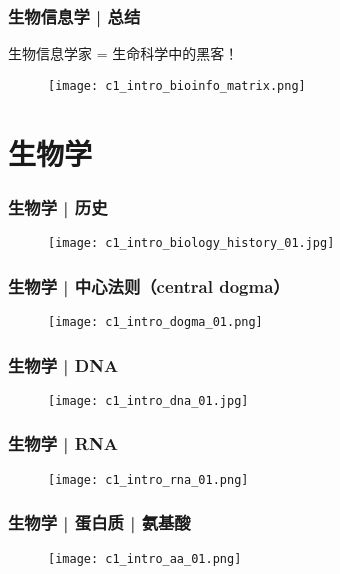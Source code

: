 \begin{frame}
  \frametitle{生物信息学 | 总结}
  \begin{center}
    {\Large 生物信息学家 = 生命科学中的黑客！}
  \end{center}
  \vspace{-1em}
  \begin{figure}
    \centering
    \texttt{[image: c1\_intro\_bioinfo\_matrix.png]}
  \end{figure}
\end{frame}

\section{生物学}
\begin{frame}
  \frametitle{生物学 | 历史}
  \begin{figure}
    \centering
    \texttt{[image: c1\_intro\_biology\_history\_01.jpg]}
  \end{figure}
\end{frame}

\begin{frame}
  \frametitle{生物学 | 中心法则（central dogma）}
  \begin{figure}
    \centering
    \texttt{[image: c1\_intro\_dogma\_01.png]}
  \end{figure}
\end{frame}

\begin{frame}
  \frametitle{生物学 | \alert{DNA}}
  \begin{figure}
    \centering
    \texttt{[image: c1\_intro\_dna\_01.jpg]}
  \end{figure}
\end{frame}

\begin{frame}
  \frametitle{生物学 | \alert{RNA}}
  \begin{figure}
    \centering
    \texttt{[image: c1\_intro\_rna\_01.png]}
  \end{figure}
\end{frame}

\begin{frame}
  \frametitle{生物学 | 蛋白质 | \alert{氨基酸}}
  \vspace{-0.6em}
  \begin{figure}
    \centering
    \texttt{[image: c1\_intro\_aa\_01.png]}
  \end{figure}
\end{frame}

